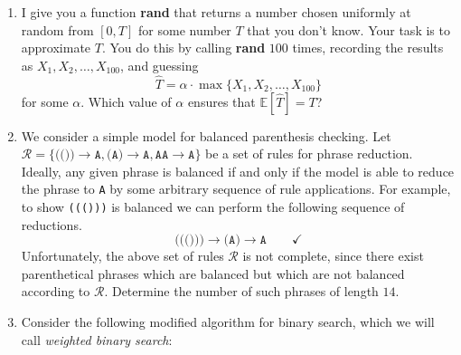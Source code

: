 \documentclass[10pt]{article}
\begin{document}
\begin{enumerate}
\item I give you a function \textbf{rand} that returns a number chosen uniformly at random from $[0,T]$ for some number $T$ that you don't know. Your task is to approximate $T$. You do this by calling \textbf{rand} $100$ times, recording the results as $X_1,X_2,\dots,X_{100}$, and guessing \[\hat{T}=\alpha\cdot\max\{X_1,X_2,\dots,X_{100}\}\] for some $\alpha$. Which value of $\alpha$ ensures that $\mathbb{E}[\hat{T}]=T$?

\item We consider a simple model for balanced parenthesis checking. Let $\mathcal R=\{\texttt{(())}\rightarrow \texttt{A},\texttt{(A)}\rightarrow\texttt{A},\texttt{AA}\rightarrow\texttt{A}\}$ be a set of rules for phrase reduction. Ideally, any given phrase is balanced if and only if the model is able to reduce the phrase to \texttt{A} by some arbitrary sequence of rule applications. For example, to show \texttt{((()))} is balanced we can perform the following sequence of reductions.
\[\texttt{((()))}\rightarrow\texttt{(A)}\rightarrow\texttt{A}\qquad \checkmark\]
Unfortunately, the above set of rules $\mathcal R$ is not complete, since there exist parenthetical phrases which are balanced but which are not balanced according to $\mathcal R$.  Determine the number of such phrases of length $14$. %


\item Consider the following modified algorithm for binary search, which we will call \textit{weighted binary search}:


\end{enumerate}
\end{document}
